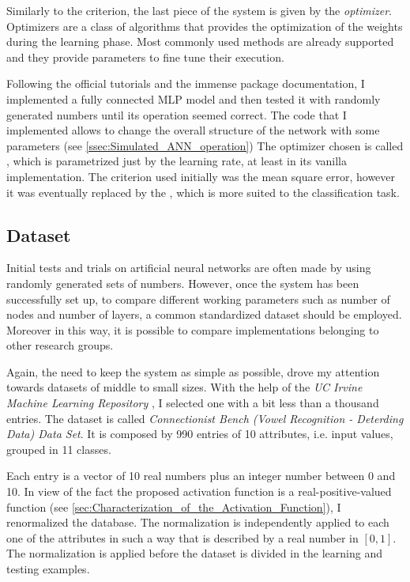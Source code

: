 Similarly to the criterion, the last piece of the system is given by the \textit{optimizer}.
Optimizers are a class of algorithms that provides the optimization of the weights during the learning phase.
Most commonly used methods are already supported and they provide parameters to fine tune their execution.

Following the official tutorials and the immense package documentation, I implemented a fully connected \acf{MLP} model and then tested it with randomly generated numbers until its operation seemed correct.
The code that I implemented allows to change the overall structure of the network with some parameters (see \autoref{ssec:Simulated_ANN_operation})
The optimizer chosen is called , which is parametrized just by the learning rate, at least in its vanilla implementation.
The criterion used initially was the mean square error, however it was eventually replaced by the , which is more suited to the classification task.

\subsection{Dataset}
\label{ssec:PyDataset}
Initial tests and trials on artificial neural networks are often made by using randomly generated sets of numbers.
However, once the system has been successfully set up, to compare different working parameters such as number of nodes and number of layers, a common standardized dataset should be employed.
Moreover in this way, it is possible to compare implementations belonging to other research groups.

Again, the need to keep the system as simple as possible, drove my attention towards datasets of middle to small sizes.
With the help of the \textit{UC Irvine Machine Learning Repository} \cite{UCIMLR}, I selected one with a bit less than a thousand entries.
The dataset is called \textit{Connectionist Bench (Vowel Recognition - Deterding Data) Data Set}.
It is composed by \num{990} entries of \num{10} attributes, i.e. input values, grouped in \num{11} classes.

Each entry is a vector of \num{10} real numbers plus an integer number between \num{0} and \num{10}.
In view of the fact the proposed activation function is a real-positive-valued function (see \autoref{sec:Characterization_of_the_Activation_Function}), I renormalized the database.
The normalization is independently applied to each one of the attributes in such a way that is described by a real number in $[0,1]$.
The normalization is applied before the dataset is divided in the learning and testing examples.

